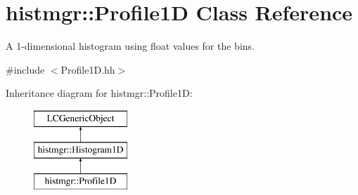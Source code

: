 \section{histmgr\-:\-:Profile1\-D Class Reference}
\label{classhistmgr_1_1Profile1D}


A 1-\/dimensional histogram using float values for the bins.  




{\ttfamily \#include $<$Profile1\-D.\-hh$>$}

Inheritance diagram for histmgr\-:\-:Profile1\-D\-:\begin{figure}[H]
\begin{center}
\leavevmode
\includegraphics[height=3.000000cm]{classhistmgr_1_1Profile1D}
\end{center}
\end{figure}
